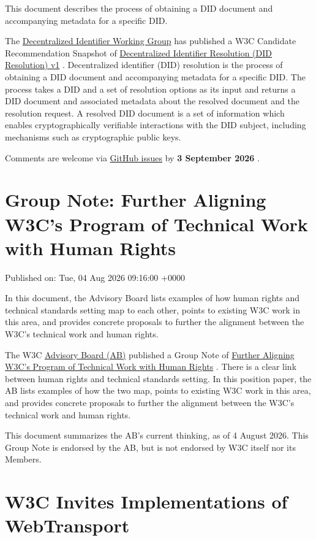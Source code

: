 \documentclass[11pt,a4paper]{article}
\begin{document}
This document describes the process of obtaining a DID document and accompanying metadata for a specific DID.

The \href{https://www.w3.org/groups/wg/did}{Decentralized Identifier Working Group} has published a W3C Candidate Recommendation Snapshot of \href{https://www.w3.org/TR/2026/CR-did-resolution-1.0-20260806/}{Decentralized Identifier Resolution (DID Resolution) v1} . Decentralized identifier (DID) resolution is the process of obtaining a DID document and accompanying metadata for a specific DID. The process takes a DID and a set of resolution options as its input and returns a DID document and associated metadata about the resolved document and the resolution request. A resolved DID document is a set of information which enables cryptographically verifiable interactions with the DID subject, including mechanisms such as cryptographic public keys.

Comments are welcome via \href{https://github.com/w3c/did-resolution/issues/}{GitHub issues} by \textbf{3 September 2026} .

\section{Group Note: Further Aligning W3C's Program of Technical Work with Human Rights}

Published on: Tue, 04 Aug 2026 09:16:00 +0000

In this document, the Advisory Board lists examples of how human rights and technical standards setting map to each other, points to existing W3C work in this area, and provides concrete proposals to further the alignment between the W3C's technical work and human rights.

The W3C \href{https://www.w3.org/groups/other/ab}{Advisory Board (AB)} published a Group Note of \href{https://www.w3.org/TR/2026/NOTE-furthering-human-rights-20260804/}{Further Aligning W3C's Program of Technical Work with Human Rights} . There is a clear link between human rights and technical standards setting. In this position paper, the AB lists examples of how the two map, points to existing W3C work in this area, and provides concrete proposals to further the alignment between the W3C's technical work and human rights.

This document summarizes the AB's current thinking, as of 4 August 2026. This Group Note is endorsed by the AB, but is not endorsed by W3C itself nor its Members.

\section{W3C Invites Implementations of WebTransport}
\end{document}

